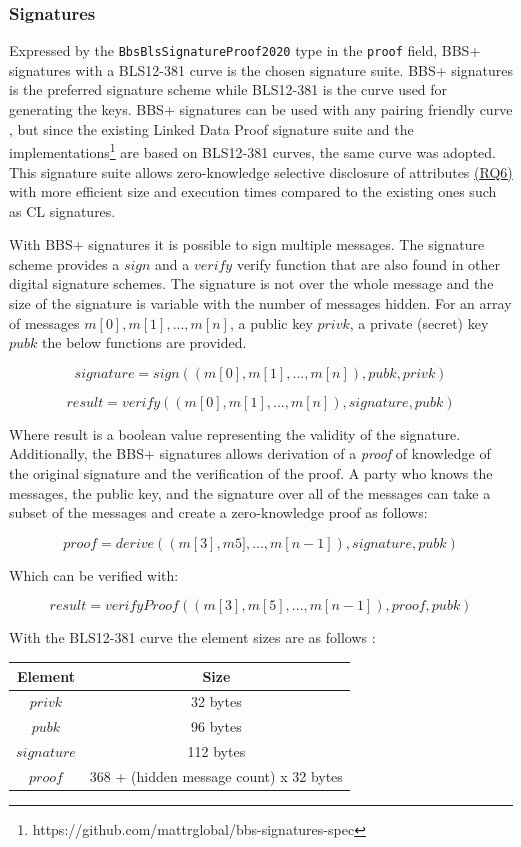 \subsubsection{Signatures}

Expressed by the \lstinline{BbsBlsSignatureProof2020} type in the \lstinline{proof} field, BBS+ signatures with a BLS12-381 curve is the chosen signature suite. BBS+ signatures is the preferred signature scheme while BLS12-381 is the curve used for generating the keys. BBS+ signatures can be used with any pairing friendly curve \parencite{irtf-cfrg-pairing-friendly-curves-09}, but since the existing Linked Data Proof signature suite \parencite{looker_steele_2021} and the implementations\footnote{https://github.com/mattrglobal/bbs-signatures-spec} are based on BLS12-381 curves, the same curve was adopted. This signature suite allows zero-knowledge selective disclosure of attributes \hyperref[rq:selective-disclosure]{(RQ6)} with more efficient size and execution times \parencite{anoncreds} compared to the existing ones such as \acrshort{CL} signatures. 

With BBS+ signatures it is possible to sign multiple messages. The signature scheme provides a $sign$ and a $verify$ verify function that are also found in other digital signature schemes. The signature is not over the whole message and the size of the signature is variable with the number of messages hidden. For an array of messages $m[0], m[1], ..., m[n]$, a public key $privk$, a private (secret) key $pubk$ the below functions are provided.

\[signature = sign((m[0], m[1], ..., m[n]), pubk, privk)\]

\[result = verify((m[0], m[1], ..., m[n]), signature, pubk)\]

Where result is a boolean value representing the validity of the signature. Additionally, the BBS+ signatures allows derivation of a \textit{proof} of knowledge of the original signature and the verification of the proof. A party who knows the messages, the public key, and the signature over all of the messages can take a subset of the messages and create a zero-knowledge proof as follows:

\[proof = derive( (m[3], m5],..., m[n-1]), signature, pubk)\]

Which can be verified with: 

\[result = verifyProof( (m[3], m[5],..., m[n-1]), proof, pubk) \]

With the BLS12-381 curve the element sizes are as follows \parencite{mattrglobal_2021}:
\begin{center}
\begin{tabular}{ c c }
  Element & Size    \\
  \hline
  $privk$   &   32 bytes    \\
  $pubk$    &   96 bytes    \\
  $signature$ & 112 bytes   \\
  $proof$   &   368 + (hidden message count) x 32 bytes
\end{tabular}
\end{center}


